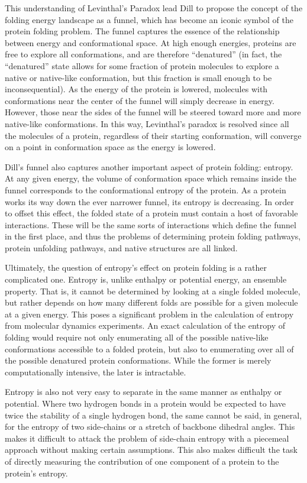 This understanding of Levinthal's Paradox lead Dill to propose the concept of the folding energy landscape as a funnel\cite{Dill:2008p283}, which has become an iconic symbol of the protein folding problem. The funnel captures the essence of the relationship between energy and conformational space. At high enough energies, proteins are free to explore all conformations, and are therefore ``denatured'' (in fact, the ``denatured'' state allows for some fraction of protein molecules to explore a native or native-like conformation, but this fraction is small enough to be inconsequential). As the energy of the protein is lowered, molecules with conformations near the center of the funnel will simply decrease in energy. However, those near the sides of the funnel will be steered toward more and more native-like conformations. In this way, Levinthal's paradox is resolved since all the molecules of a protein, regardless of their starting conformation, will converge on a point in conformation space as the energy is lowered.

Dill's funnel also captures another important aspect of protein folding: entropy. At any given energy, the volume of conformation space which remains inside the funnel corresponds to the conformational entropy of the protein. As a protein works its way down the ever narrower funnel, its entropy is decreasing. In order to offset this effect, the folded state of a protein must contain a host of favorable interactions. These will be the same sorts of interactions which define the funnel in the first place, and thus the problems of determining protein folding pathways, protein unfolding pathways, and native structures are all linked. 

Ultimately, the question of entropy's effect on protein folding is a rather complicated one. Entropy is, unlike enthalpy or potential energy, an ensemble property. That is, it cannot be determined by looking at a single folded molecule, but rather depends on how many different folds are possible for a given molecule at a given energy\cite{Meirovitch:2007p317}. This poses a significant problem in the calculation of entropy from molecular dynamics experiments. An exact calculation of the entropy of folding would require not only enumerating all of the possible native-like conformations accessible to a folded protein, but also to enumerating over all of the possible denatured protein conformations. While the former is merely computationally intensive, the later is intractable.

Entropy is also not very easy to separate in the same manner as enthalpy or potential\cite{Brady:1997p318}. Where two hydrogen bonds in a protein would be expected to have twice the stability of a single hydrogen bond, the same cannot be said, in general, for the entropy of two side-chains or a stretch of backbone dihedral angles. This makes it difficult to attack the problem of side-chain entropy with a piecemeal approach without making certain assumptions. This also makes difficult the task of directly measuring the contribution of one component of a protein to the protein's entropy.
